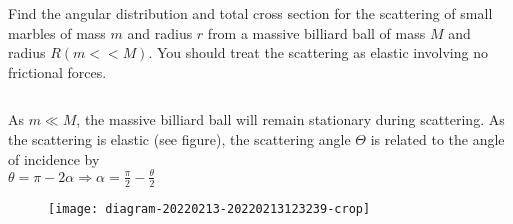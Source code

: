 \begin{enumerate}
		\begin{minipage}{\textwidth}
		\item Find the angular distribution and total cross section for the scattering of small marbles of mass $m$ and radius $r$ from a massive billiard ball of mass $M$ and radius $R(m<<M)$.
		You should treat the scattering as elastic involving no frictional forces.
	\end{minipage}
	\begin{answer}$\left. \right. $\\
		\begin{minipage}{0.5\textwidth}
		 As $m \ll M$, the massive billiard ball will remain stationary during scattering. As the scattering is elastic (see figure), the scattering angle $\Theta$ is related to the angle of incidence by\\
		$
		\theta=\pi-2 \alpha \Rightarrow \alpha=\frac{\pi}{2}-\frac{\theta}{2}
		$
		\end{minipage}
	\begin{minipage}{0.5\textwidth}
	\begin{figure}[H]
		\centering
		\texttt{[image: diagram-20220213-20220213123239-crop]}
	\end{figure}
	\end{minipage}


\end{answer}
\end{enumerate}
